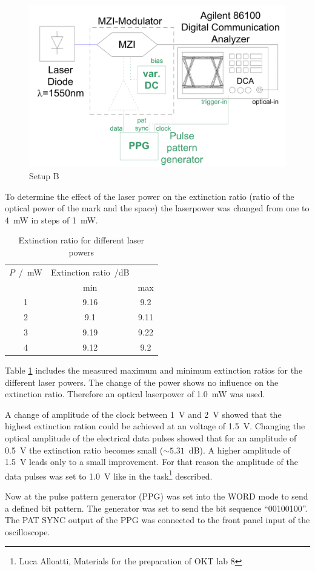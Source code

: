 \begin{figure}%
\centering
\includegraphics[width=.6\columnwidth]{Grafiken/B_setup.png}%
\caption{Setup B}%
\label{fig:B_setup}%
\end{figure} 

To determine the effect of the laser power on the extinction ratio (ratio of the optical power of the mark and the space) the laserpower was changed from one to 4~mW in steps of 1~mW. 

\begin{table}%
\centering
\caption{Extinction ratio for different laser powers}
 
\begin{tabular}{ccc}
\toprule
$P$~/~mW	& Extinction ratio~/dB\\
&min&max\\
\midrule
1 &9.16&9.2\\
2 &9.1&9.11\\
3 &9.19&9.22\\
4 &9.12&9.2\\
\bottomrule 
\end{tabular}
\label{tab:B_power}
\end{table}
Table \ref{tab:B_power} includes the measured maximum and minimum extinction ratios for the different laser powers. The change of the power shows no influence on the extinction ratio. Therefore an optical laserpower of 1.0~mW was used.

A change of amplitude of the clock between 1~V and 2~V showed that the highest extinction ration could be achieved at an voltage of 1.5~V. Changing the optical amplitude of the electrical data pulses showed that for an amplitude of 0.5~V the extinction ratio becomes small ($\sim 5.31$~dB). A higher amplitude of 1.5~V leads only to a small improvement. For that reason the amplitude of the data pulses was set to 1.0~V like in the task\footnote[3]{Luca Alloatti, Materials for the preparation of OKT lab 8} described.

Now at the pulse pattern generator (PPG) was set into the WORD mode to send a defined bit pattern. The generator was set to send the bit sequence ``00100100''. The PAT SYNC output of the PPG was connected to the front panel input of the oscilloscope.

